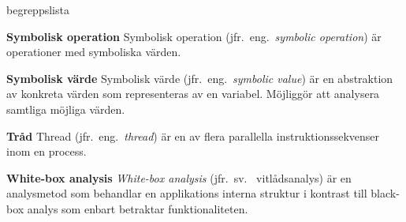 \begin{labeling}{begreppslista}
    \item [\textbf{Symbolisk operation}] Symbolisk operation (jfr.\ eng.\ \emph{symbolic
        operation}) är operationer med symboliska värden.

    \item [\textbf{Symbolisk värde}] Symbolisk värde (jfr.\ eng.\ \emph{symbolic
        value}) är en abstraktion av konkreta värden som representeras av en
    variabel. Möjliggör att analysera samtliga möjliga värden.

    \item [\textbf{Tråd}] Thread (jfr.\ eng.\ \emph{thread}) är en av flera
    parallella instruktionssekvenser inom en process.

    \item [\textbf{White-box analysis}] \emph{White-box analysis} (jfr.\ sv.
    \ vitlådsanalys) är en analysmetod som behandlar en applikations
    interna struktur i kontrast till black-box analys som enbart betraktar
    funktionaliteten.

\end{labeling}
